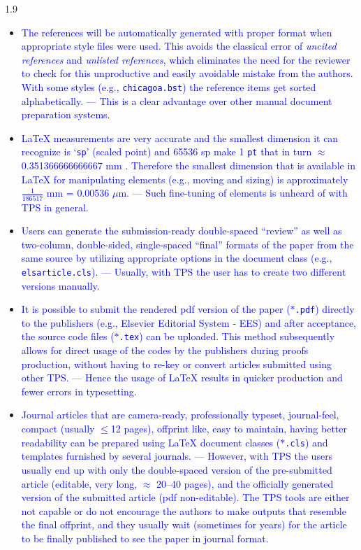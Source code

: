 \documentclass[phd]{ndsu-thesis-2022}
\newcommand\myspacing{1.9} %
\newcommand\italk[1]{\textcolor{blue}{#1}}  %
\newcommand\lx{\LaTeX\xspace}
\newcommand\vb[1]{\textcolor{blue}{\texttt{#1}}}%
\begin{document}
\begin{spacing}{\myspacing}
\begin{itemize}[leftmargin=*, itemsep=0pt, parsep=3pt]
\item \italk{The references will be automatically generated with proper format when appropriate style files were used. This avoids the classical error of \emph{uncited references} and \emph{unlisted references}, which eliminates the need for the reviewer to check for this unproductive and easily avoidable mistake from the authors.  With some styles (e.g., \vb{chicagoa.bst}) the reference items get sorted alphabetically. --- This is a clear advantage over other manual document preparation systems.}   

\item \italk{\lx measurements are very accurate and the smallest dimension it can recognize is `\vb{sp}' (scaled point) and 65536 sp make 1 \vb{pt} that in turn $\approx$ 0.351366666666667 mm \citep{Wikibook2016}. Therefore the smallest dimension that is available in \lx for manipulating elements (e.g., moving and sizing) is approximately $\frac{1}{186517}$ mm = 0.00536 $\mu$m. --- Such fine-tuning of elements is unheard of with TPS in general.} 

\item \italk{Users can generate the submission-ready double-spaced ``review'' as well as two-column, double-sided, single-spaced ``final'' formats of the paper from the same source by utilizing appropriate options in the document class (e.g., \vb{elsarticle.cls}). --- Usually, with TPS the user has to create two different versions manually.}   

\item \italk{It is possible to submit the rendered pdf version of the paper ($\ast$\vb{.pdf}) directly to the publishers (e.g., Elsevier Editorial System - EES) and after acceptance, the source code files ($\ast$\vb{.tex}) can be uploaded.  This method subsequently allows for direct usage of the codes by the publishers during proofs production, without having to re-key or convert articles submitted using other TPS. --- Hence the usage of \lx results in quicker production and fewer errors in typesetting.}   

\item \italk{Journal articles that are camera-ready, professionally typeset, journal-feel, compact (usually $\le$12 pages), offprint like, easy to maintain, having better readability can be prepared using \lx document classes ($\ast$\vb{.cls}) and templates furnished by several journals. --- However, with TPS the users usually end up with only the double-spaced version of the pre-submitted article (editable, very long, $\approx$ 20--40 pages), and the officially generated version of the submitted article (pdf non-editable). The TPS tools are either not capable or do not encourage the authors to make outputs that resemble the final offprint, and they usually wait (sometimes for years) for the article to be finally published to see the paper in journal format.}    


\end{itemize}
\end{spacing}
\end{document}
